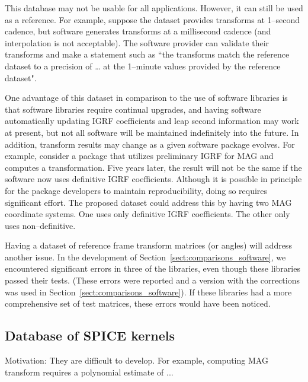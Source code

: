 \documentclass[draft]{agujournal2019}
\begin{document}
This database may not be usable for all applications. However, it can still be used as a reference. For example, suppose the dataset provides transforms at 1--second cadence, but software generates transforms at a millisecond cadence (and interpolation is not acceptable). The software provider can validate their transforms and make a statement such as ``the transforms match the reference dataset to a precision of … at the 1--minute values provided by the reference dataset".

One advantage of this dataset in comparison to the use of software libraries is that software libraries require continual upgrades, and having software automatically updating IGRF coefficients and leap second information may work at present, but not all software will be maintained indefinitely into the future. In addition, transform results may change as a given software package evolves. For example, consider a package that utilizes preliminary IGRF for MAG and computes a transformation. Five years later, the result will not be the same if the software now uses definitive IGRF coefficients. Although it is possible in principle for the package developers to maintain reproducibility, doing so requires significant effort. The proposed dataset could address this by having two MAG coordinate systems. One uses only definitive IGRF coefficients. The other only uses non--definitive.

Having a dataset of reference frame transform matrices (or angles) will address another issue. In the development of Section~\ref{sect:comparisons_software}, we encountered significant errors in three of the libraries, even though these libraries passed their tests. (These errors were reported and a version with the corrections was used in Section~\ref{sect:comparisons_software}). If these libraries had a more comprehensive set of test matrices, these errors would have been noticed.


\subsection{Database of SPICE kernels}

Motivation: They are difficult to develop. For example, computing MAG transform requires a polynomial estimate of ...

\end{document}
